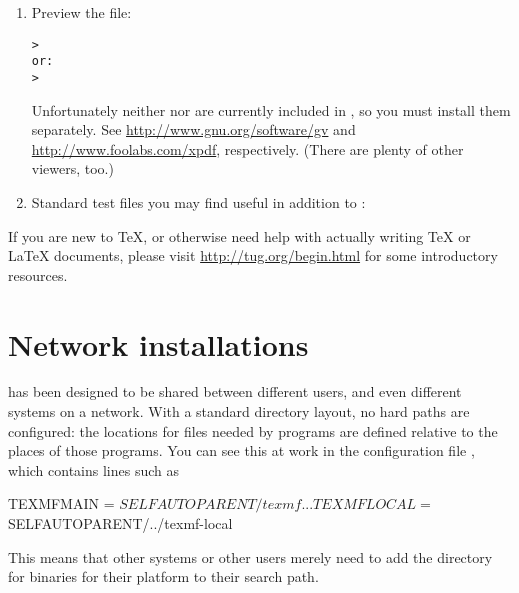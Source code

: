 \documentclass{article}
\begin{document}
\begin{enumerate}
\item Preview the  file:
\begin{alltt}
> 
\textrm{or:}
> 
\end{alltt}
Unfortunately neither  nor  are currently
included in \TL{}, so you must install them separately.  See
\url{http://www.gnu.org/software/gv} and
\url{http://www.foolabs.com/xpdf}, respectively.  (There are plenty of
other  viewers, too.)

\item Standard test files you may find useful in addition to
:


\end{enumerate}

If you are new to \TeX{}, or otherwise need help with actually writing
\TeX{} or \LaTeX{} documents, please visit
\url{http://tug.org/begin.html} for some introductory resources.


\section{Network installations}
\label{sec:netinstall}

\TL{} has been designed to be shared between different users, and even
different systems on a network. With a standard directory layout, no
hard paths are configured: the locations for files needed by \TL{}
programs are defined relative to the places of those programs.  You can
see this at work in the configuration file
, which contains lines such as
\begin{sverbatim}
TEXMFMAIN = $SELFAUTOPARENT/texmf
...
TEXMFLOCAL = $SELFAUTOPARENT/../texmf-local
\end{sverbatim}
This means that other systems or other users merely need to add the
directory for \TL{} binaries for their platform to their search path.
\end{document}
